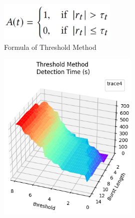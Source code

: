 \documentclass[aspectratio=169, 8pt]{beamer}
\begin{document}
\begin{frame}
\begin{columns}[T]
    \begin{column}{0.5\linewidth}
        \begin{figure}
            \centering
            \includegraphics[width = 0.5\textwidth]{images/threshold_formula.png}
            \caption{Formula of Threshold Method}
            \label{fig:enter-label}
        \end{figure}
        \begin{figure}
            \centering
            \includegraphics[width = 0.6\textwidth]{images/Garrett_detection_time.png}
            \label{fig:enter-label}
        \end{figure}
    \end{column}
\end{columns}

\end{frame}
\end{document}
